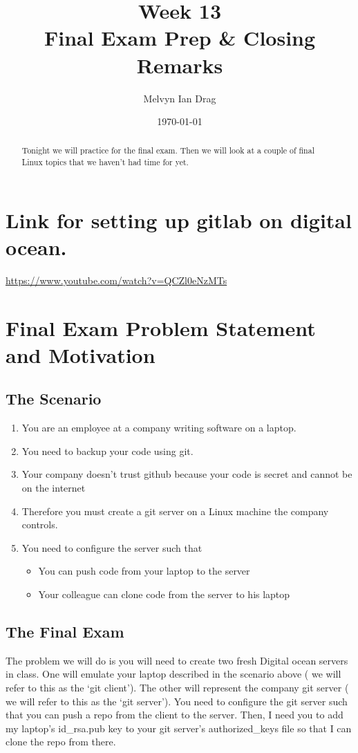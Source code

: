 \documentclass[10pt]{article}
\title{\textbf{Week 13} \\
\Large Final Exam Prep \& Closing Remarks}
\author{ Melvyn Ian Drag }
\date{\today}
\begin{document}
\maketitle

\begin{abstract}
Tonight we will practice for the final exam. Then we will look at a couple of
final Linux topics that we haven't had time for yet.
\end{abstract}

\section{Link for setting up gitlab on digital ocean.}
\url{https://www.youtube.com/watch?v=QCZl0eNzMTs}

\section{Final Exam Problem Statement and Motivation} 
\subsection{The Scenario}
\begin{enumerate}
\item You are an employee at a company writing software on a laptop.
\item You need to backup your code using git.
\item Your company doesn't trust github because your code is secret and cannot
be on the internet
\item Therefore you must create a git server on a Linux machine the company
controls.
\item You need to configure the server such that 
\begin{itemize}
\item You can push code from your laptop to the server
\item Your colleague can clone code from the server to his laptop
\end{itemize}
\end{enumerate}

\subsection{The Final Exam}
The problem we will do is you will need to create two fresh Digital ocean
servers in class. One will emulate your laptop described in the scenario above (
we will refer to this as the `git client').
The other will represent the company git server ( we will refer to this as the
`git server'). You need to configure the git server such that you can push a
repo from the client to the server. Then, I need you to add my laptop's
id\_rsa.pub key to your git server's authorized\_keys file so that I can clone
the repo from there.
\end{document}
